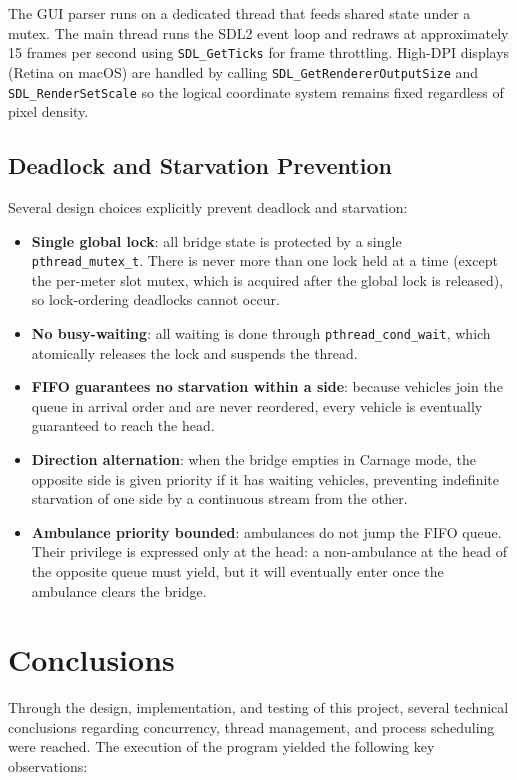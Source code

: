 \documentclass[12pt]{article}
\begin{document}
The GUI parser runs on a dedicated thread that feeds shared state under a
mutex. The main thread runs the SDL2 event loop and redraws at approximately
15 frames per second using \texttt{SDL\_GetTicks} for frame throttling.
High-DPI displays (Retina on macOS) are handled by calling
\texttt{SDL\_GetRendererOutputSize} and \texttt{SDL\_RenderSetScale} so
the logical coordinate system remains fixed regardless of pixel density.

\subsection{Deadlock and Starvation Prevention}

Several design choices explicitly prevent deadlock and starvation:

\begin{itemize}
  \item \textbf{Single global lock}: all bridge state is protected by a
    single \texttt{pthread\_mutex\_t}. There is never more than one lock
    held at a time (except the per-meter slot mutex, which is acquired after
    the global lock is released), so lock-ordering deadlocks cannot occur.
  \item \textbf{No busy-waiting}: all waiting is done through
    \texttt{pthread\_cond\_wait}, which atomically releases the lock and
    suspends the thread.
  \item \textbf{FIFO guarantees no starvation within a side}: because
    vehicles join the queue in arrival order and are never reordered, every
    vehicle is eventually guaranteed to reach the head.
  \item \textbf{Direction alternation}: when the bridge empties in Carnage
    mode, the opposite side is given priority if it has waiting vehicles,
    preventing indefinite starvation of one side by a continuous stream from
    the other.
  \item \textbf{Ambulance priority bounded}: ambulances do not jump the FIFO
    queue. Their privilege is expressed only at the head: a non-ambulance at
    the head of the opposite queue must yield, but it will eventually enter
    once the ambulance clears the bridge.
\end{itemize}


\section{Conclusions}
Through the design, implementation, and testing of this project, several technical conclusions regarding concurrency, thread management, and process scheduling were reached. The execution of the program yielded the following key observations:
\end{document}
